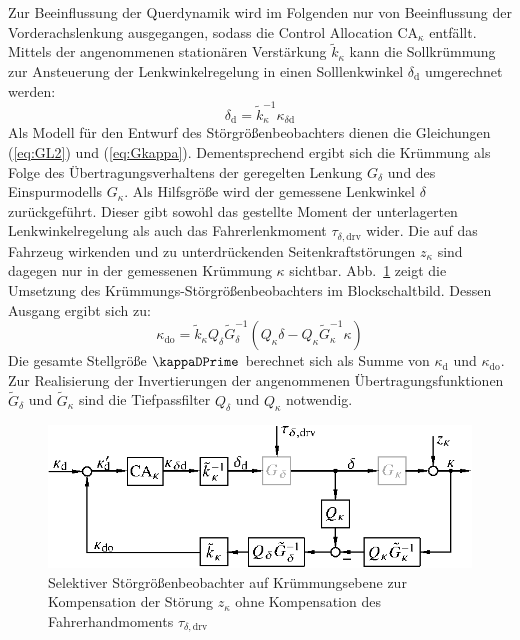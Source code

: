 Zur Beeinflussung der Querdynamik wird im Folgenden nur von Beeinflussung der Vorderachslenkung ausgegangen, sodass die Control Allocation $\mathrm{CA}_\kappa$ entfällt.  Mittels der angenommenen stationären Verstärkung $\tilde k_\kappa$ kann die Sollkrümmung zur Ansteuerung der Lenkwinkelregelung in einen Solllenkwinkel $\delta_\mathrm{d}$ umgerechnet werden:
\begin{equation}
\delta_\mathrm{d} = \tilde k_\kappa^{-1} \kappa_{\delta\mathrm{d}}
\end{equation}
Als Modell für den Entwurf des Störgrößenbeobachters dienen die Gleichungen (\ref{eq:GL2}) und (\ref{eq:Gkappa}).  Dementsprechend ergibt sich die Krümmung als Folge des Übertragungsverhaltens der geregelten Lenkung $G_\delta$ und des Einspurmodells $G_\kappa$.  
Als Hilfsgröße wird der gemessene Lenkwinkel $\delta$ zurückgeführt.  Dieser gibt sowohl das gestellte Moment der unterlagerten Lenkwinkelregelung als auch das Fahrerlenkmoment $\tau_{\delta,\mathrm{drv}}$ wider.  Die auf das Fahrzeug wirkenden und zu unterdrückenden Seitenkraftstörungen $z_\kappa$ sind dagegen nur in der gemessenen Krümmung $\kappa$ sichtbar.  Abb.~\ref{fig:DO_kappa} zeigt die Umsetzung des Krümmungs-Störgrößenbeobachters im Blockschaltbild.  Dessen Ausgang ergibt sich zu:
\begin{equation}
\kappa_\mathrm{do} = \tilde k_\kappa Q_\delta \tilde G_\delta^{-1} \left( Q_\kappa \delta - Q_\kappa \tilde{G}_\kappa^{-1} \kappa \right)
\end{equation}
Die gesamte Stellgröße $\kappaDPrime$ berechnet sich als Summe von $\kappa_\mathrm{d}$ und $\kappa_\mathrm{do}$.  Zur Realisierung der Invertierungen der angenommenen Übertragungsfunktionen $\tilde G_\delta$ und $\tilde G_\kappa$ sind die Tiefpassfilter $Q_\delta$ und $Q_\kappa$ notwendig.  
%
\begin{figure}[ht]
	\centering
	\includegraphics{Bilder/DO_allg/DO_kappa.eps}
	\caption{Selektiver Störgrößenbeobachter auf Krümmungsebene zur Kompensation der Störung $z_\kappa$ ohne Kompensation des Fahrerhandmoments $\tau_{\delta,\mathrm{drv}}$}
	\label{fig:DO_kappa}
\end{figure}

